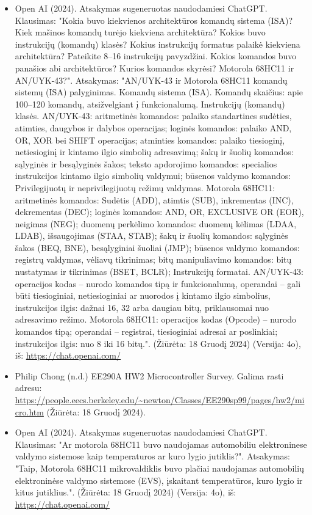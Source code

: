 \documentclass[a4paper,12pt]{article}
\begin{document}
\begin{itemize}
    \item Open AI (2024). Atsakymas sugeneruotas naudodamiesi ChatGPT. Klausimas: "Kokia buvo kiekvienos architektūros komandų sistema (ISA)? Kiek mašinos komandų turėjo kiekviena architektūra? Kokios buvo instrukcijų (komandų) klasės? Kokius instrukcijų formatus palaikė kiekviena architektūra? Pateikite 8–16 instrukcijų pavyzdžiai. Kokios komandos buvo panašios abi architektūros? Kurios komandos skyrėsi? Motorola 68HC11 ir AN/UYK-43?". Atsakymas: "AN/UYK-43 ir Motorola 68HC11 komandų sistemų (ISA) palyginimas. Komandų sistema (ISA). Komandų skaičius: apie 100–120 komandų, atsižvelgiant į funkcionalumą. Instrukcijų (komandų) klasės. AN/UYK-43: aritmetinės komandos: palaiko standartines sudėties, atimties, daugybos ir dalybos operacijas; loginės komandos: palaiko AND, OR, XOR bei SHIFT operacijas; atminties komandos: palaiko tiesioginį, netiesioginį ir kintamo ilgio simbolių adresavimą; šakų ir šuolių komandos: sąlyginės ir besąlyginės šakos; teksto apdorojimo komandos: specialios instrukcijos kintamo ilgio simbolių valdymui; būsenos valdymo komandos: Privilegijuotų ir neprivilegijuotų režimų valdymas. Motorola 68HC11: aritmetinės komandos: Sudėtis (ADD), atimtis (SUB), inkrementas (INC), dekrementas (DEC); loginės komandos: AND, OR, EXCLUSIVE OR (EOR), neigimas (NEG); duomenų perkėlimo komandos: duomenų kėlimas (LDAA, LDAB), išsaugojimas (STAA, STAB); šakų ir šuolių komandos: sąlyginės šakos (BEQ, BNE), besąlyginiai šuoliai (JMP); būsenos valdymo komandos: registrų valdymas, vėliavų tikrinimas; bitų manipuliavimo komandos: bitų nustatymas ir tikrinimas (BSET, BCLR); Instrukcijų formatai. AN/UYK-43: operacijos kodas – nurodo komandos tipą ir funkcionalumą, operandai – gali būti tiesioginiai, netiesioginiai ar nuorodos į kintamo ilgio simbolius, instrukcijos ilgis: dažnai 16, 32 arba daugiau bitų, priklausomai nuo adresavimo režimo. Motorola 68HC11: operacijos kodas (Opcode) – nurodo komandos tipą; operandai – registrai, tiesioginiai adresai ar poslinkiai; instrukcijos ilgis: nuo 8 iki 16 bitų.". (Žiūrėta: 18 Gruodį 2024) (Versija: 4o), iš: \url{https://chat.openai.com/}
    \item Philip Chong (n.d.) EE290A HW2 Microcontroller Survey. Galima rasti adresu: \url{https://people.eecs.berkeley.edu/~newton/Classes/EE290sp99/pages/hw2/micro.htm} (Žiūrėta: 18 Gruodį 2024).
    \item Open AI (2024). Atsakymas sugeneruotas naudodamiesi ChatGPT. Klausimas: "Ar motorola 68HC11 buvo naudojamas automobiliu elektroninese valdymo sistemose kaip temperaturos ar kuro lygio jutiklis?". Atsakymas: "Taip, Motorola 68HC11 mikrovaldiklis buvo plačiai naudojamas automobilių elektroninėse valdymo sistemose (EVS), įskaitant temperatūros, kuro lygio ir kitus jutiklius.". (Žiūrėta: 18 Gruodį 2024) (Versija: 4o), iš: \url{https://chat.openai.com/}
    
\end{itemize}
\end{document}

